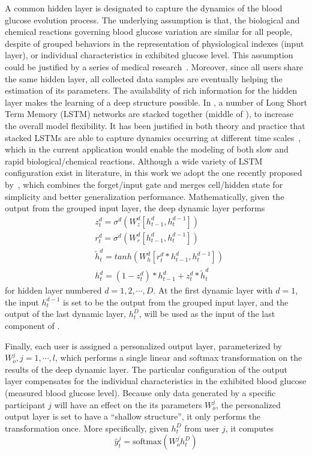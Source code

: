 A common hidden layer is designated to capture the dynamics of the blood glucose evolution process.
The underlying assumption is that, the biological and chemical reactions governing blood glucose variation are similar for all people, despite of grouped behaviors in the representation of physiological indexes (input layer), or individual characteristics in exhibited glucose level.
This assumption could be justified by a series of medical research~\cite{bib:JCEM13:Eckert,bib:JDST10:Vaddiraju}.
Moreover, since all users share the same hidden layer, all collected data samples are eventually helping the estimation of its parameters.
The availability of rich information for the hidden layer makes the learning of a deep structure possible.
In \sysname, a number of Long Short Term Memory (LSTM) networks are stacked together (middle of ), to increase the overall model flexibility.
It has been justified in both theory and practice that stacked LSTMs are able to capture dynamics occurring at different time scales~\cite{dyer2015transition}, which in the current application would enable the modeling of both slow and rapid biological/chemical reactions.
Although a wide variety of LSTM configuration exist in literature, in this work we adopt the one recently proposed by~\cite{koutnik2014clockwork}, which combines the forget/input gate and merges cell/hidden state for simplicity and better generalization performance.
Mathematically, given the output from the grouped input layer, the deep dynamic layer performs
\begin{equation}
\begin{aligned}
&z^d_t = \sigma^d\left( W^d_z [h_{t-1}^d,h_t^{d-1}] \right) \\
&r^d_t = \sigma^d\left( W^d_r [h_{t-1}^d,h_t^{d-1}] \right) \\
&\tilde{h}_t^d = tanh\left( W^d_h [r_t^d*h_{t-1}^d,h_t^{d-1}] \right) \\
&h^d_t = (1-z_t^d)*h_{t-1}^d + z_t^d*\tilde{h}_t^d
\end{aligned}
\end{equation}
for hidden layer numbered $d = 1,2,\cdots,D$. At the first dynamic layer with $d=1$, the input $h_t^{d-1}$ is set to be the output from the grouped input layer, and the output of the last dynamic layer, $h^D_t$, will be used as the input of the last component of \modelname.

Finally, each user is assigned a personalized output layer, parameterized by $W_o^j, j=1,\cdots,l$, which performs a single linear and softmax transformation on the results of the deep dynamic layer.
The particular configuration of the output layer compensates for the individual characteristics in the exhibited blood glucose (\ie measured blood glucose level).
Because only data generated by a specific participant $j$ will have an effect on the its parameters $W_o^j$, the personalized output layer is set to have a ``shallow structure'', \ie it only performs the transformation once.
More specifically, given $h^D_t$ from user $j$, it computes
\begin{equation}
\hat{y}_t^j = \text{softmax} \left( W_o^j h^D_t \right)
\end{equation}

